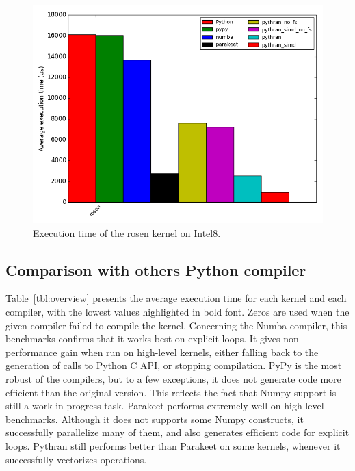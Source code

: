 \documentclass[10pt, preprint]{sigplanconf}
\begin{document}
\begin{figure}[t]
\centering
\includegraphics[width=.5\textwidth]{rosen_intel8.png}
\caption{Execution time of the rosen kernel on Intel8.}
\label{fig:rosenintel8}
\end{figure}


\subsection{Comparison with others Python compiler}


Table~\ref{tbl:overview} presents the average execution time for each kernel
and each compiler, with the lowest values highlighted in
bold font. Zeros are used when the given compiler failed to
compile the kernel. Concerning the Numba compiler, this
benchmarks conﬁrms that it works best on explicit loops. It
gives non performance gain when run on high-level kernels,
either falling back to the generation of calls to Python C
API, or stopping compilation. PyPy is the most robust of
the compilers, but to a few exceptions, it does not generate
code more efﬁcient than the original version. This reﬂects
the fact that Numpy support is still a work-in-progress task.
Parakeet performs extremely well on high-level benchmarks.
Although it does not supports some Numpy constructs, it
successfully parallelize many of them, and also generates
efﬁcient code for explicit loops. Pythran still performs better
than Parakeet on some kernels, whenever it successfully
vectorizes operations.
\end{document}
